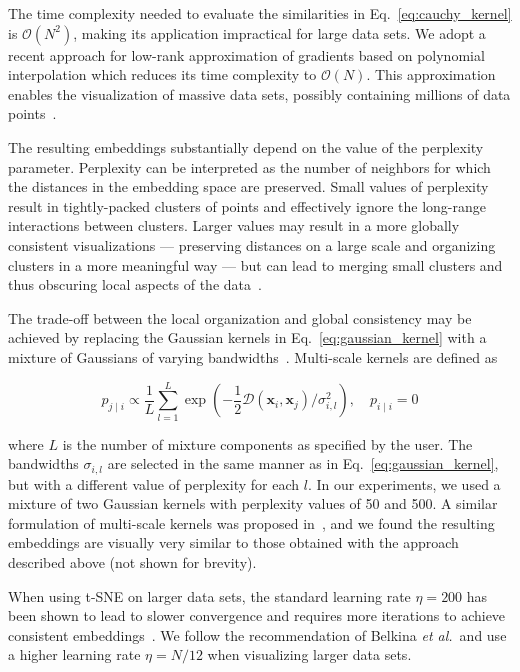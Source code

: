 \documentclass[runningheads]{llncs}
\newcommand{\etal}{\textit{et al.}}
\begin{document}
The time complexity needed to evaluate the similarities in
Eq.~\ref{eq:cauchy_kernel} is $\mathcal{O}(N^2)$, making its application
impractical for large data sets. We adopt a recent approach for low-rank
approximation of gradients based on polynomial interpolation which reduces its
time complexity to $\mathcal{O}(N)$. This approximation enables the
visualization of massive data sets, possibly containing millions of data
points~\cite{Linderman2019}.

The resulting embeddings substantially depend on the value of the perplexity
parameter. Perplexity can be interpreted as the number of neighbors for which
the distances in the embedding space are preserved. Small values of perplexity
result in tightly-packed clusters of points and effectively ignore the
long-range interactions between clusters. Larger values may result in a more
globally consistent visualizations --- preserving distances on a large scale and
organizing clusters in a more meaningful way --- but can lead to merging small
clusters and thus obscuring local aspects of the data~\cite{Kobak2019}.

The trade-off between the local organization and global consistency may be
achieved by replacing the Gaussian kernels in Eq.~\ref{eq:gaussian_kernel} with
a mixture of Gaussians of varying bandwidths~\cite{Lee2015}. Multi-scale kernels
are defined as

\begin{equation}
p_{j \mid i} \propto \frac{1}{L} \sum_{l=1}^{L} \exp \left ( - \frac{1}{2} \mathcal{D}(\mathbf{x}_i, \mathbf{x}_j ) / \sigma_{i,l}^2 \right ), \quad p_{i \mid i} = 0
\label{eq:multiscale}
\end{equation}

\noindent where $L$ is the number of mixture components as specified by the user. The bandwidths
$\sigma_{i,l}$ are selected in the same manner as in
Eq.~\ref{eq:gaussian_kernel}, but with a different value of perplexity for each
$l$. In our experiments, we used a mixture of two Gaussian kernels with
perplexity values of 50 and 500. A similar formulation of multi-scale kernels
was proposed in~\cite{Kobak2019}, and we found the resulting embeddings are
visually very similar to those obtained with the approach described above (not
shown for brevity).

When using t-SNE on larger data sets, the standard learning rate $\eta = 200$
has been shown to lead to slower convergence and requires more iterations to
achieve consistent embeddings~\cite{Belkina2019}. We follow the recommendation
of Belkina \etal ~and use a higher learning rate $\eta = N / 12$ when
visualizing larger data sets.
\end{document}
